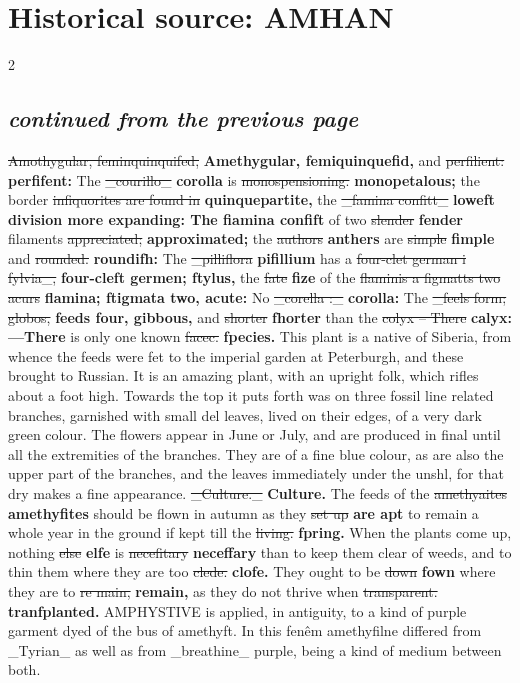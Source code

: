 \documentclass[10pt]{article}
\begin{document}
\section*{Historical source: AMHAN}
\begin{multicols}{2}
\subsection*{\textit{continued from the previous page}}
\sout{Amothygular, feminquinquifed,} \textbf{Amethygular, femiquinquefid,} and \sout{perfilient:} \textbf{perfifent:} The \sout{\_courillo\_} \textbf{corolla} is \sout{monospensioning.} \textbf{monopetalous;} the border \sout{infiquorites are found in} \textbf{quinquepartite,} the \sout{\_famina confitt\_} \textbf{loweft division more expanding: The fiamina confift} of two \sout{slender} \textbf{fender} filaments \sout{appreciated;} \textbf{approximated;} the \sout{authors} \textbf{anthers} are \sout{simple} \textbf{fimple} and \sout{rounded.} \textbf{roundifh:} The \sout{\_pilliflora} \textbf{pifillium} has a \sout{four-clet german i fylvia\_,} \textbf{four-cleft germen; ftylus,} the \sout{fate} \textbf{fize} of the \sout{flaminis a figmatts two acurs} \textbf{flamina; ftigmata two, acute:} No \sout{\_corella :\_} \textbf{corolla:} The \sout{\_feels form; globos,} \textbf{feeds four, gibbous,} and \sout{shorter} \textbf{fhorter} than the \sout{colyx – There} \textbf{calyx:—There} is only one known \sout{facec.} \textbf{fpecies.} This plant is a native of Siberia, from whence the feeds were fet to the imperial garden at Peterburgh, and these brought to Russian. It is an amazing plant, with an upright folk, which rifles about a foot high. Towards the top it puts forth was on three fossil line related branches, garnished with small del leaves, lived on their edges, of a very dark green colour. The flowers appear in June or July, and are produced in final until all the extremities of the branches. They are of a fine blue colour, as are also the upper part of the branches, and the leaves immediately under the unshl, for that dry makes a fine appearance. \sout{\_Culture.\_} \textbf{Culture.} The feeds of the \sout{amethyaites} \textbf{amethyfites} should be flown in autumn as they \sout{set up} \textbf{are apt} to remain a whole year in the ground if kept till the \sout{living.} \textbf{fpring.} When the plants come up, nothing \sout{else} \textbf{elfe} is \sout{necefitary} \textbf{neceffary} than to keep them clear of weeds, and to thin them where they are too \sout{clede.} \textbf{clofe.} They ought to be \sout{down} \textbf{fown} where they are to \sout{re main,} \textbf{remain,} as they do not thrive when \sout{transparent.} \textbf{tranfplanted.} AMPHYSTIVE is applied, in antiguity, to a kind of purple garment dyed of the bus of amethyft. In this fenêm amethyfilne differed from \_Tyrian\_ as well as from \_breathine\_ purple, being a kind of medium between both.


\end{multicols}
\end{document}
